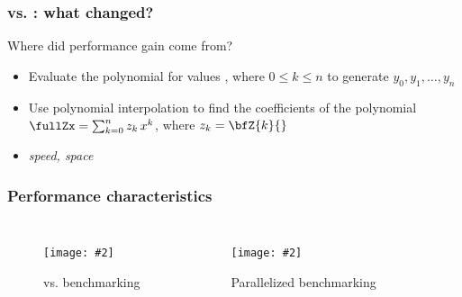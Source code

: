 \documentclass{beamer}
\newcommand{\slidefigure}[2][1]{\centering\texttt{[image: \#2]}}
\begin{document}
\begin{frame}
  \frametitle{\fftbor vs. \rnabor: what changed?}
  \begin{block}
    {Where did performance gain come from?}
    \begin{itemize}
      \item[] Evaluate the polynomial \fullZx for values \kRoU, where $0 \leq k \leq n$ to generate $y_0, y_1, \dots, y_n$
      \item[] Use polynomial interpolation to find the coefficients of the polynomial $\fullZx = \sum_{k=0}^n z_k\,x^k$, where $z_k = \bfZ{k}{}$
      \item[] {\em {} speed,  space}
    \end{itemize}
  \end{block}

\end{frame}

\begin{frame}
  \frametitle{Performance characteristics}
  \begin{columns}
    \begin{figure}
      \slidefigure{Figures/FFTbor/rnaborfftborRunTimeEvan} \caption{\rnabor vs. \fftbor benchmarking}
    \end{figure}

    \begin{figure}
      \slidefigure{Figures/FFTbor/fftborParallelRunTimes} \caption{Parallelized \fftbor benchmarking}
    \end{figure}
  \end{columns}
\end{frame}
\end{document}

